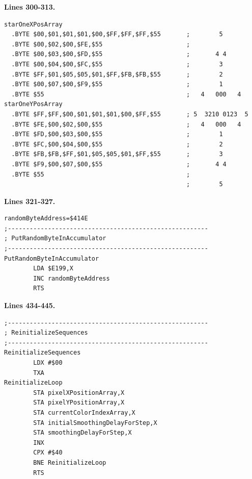 \clearpage
\textbf{Lines 300-313. }
\begin{lstlisting}[caption = Hopefully this looks familiar.]
starOneXPosArray
  .BYTE $00,$01,$01,$01,$00,$FF,$FF,$FF,$55       ;        5       
  .BYTE $00,$02,$00,$FE,$55                       ;                
  .BYTE $00,$03,$00,$FD,$55                       ;       4 4      
  .BYTE $00,$04,$00,$FC,$55                       ;        3       
  .BYTE $FF,$01,$05,$05,$01,$FF,$FB,$FB,$55       ;        2       
  .BYTE $00,$07,$00,$F9,$55                       ;        1       
  .BYTE $55                                       ;   4   000   4  
starOneYPosArray
  .BYTE $FF,$FF,$00,$01,$01,$01,$00,$FF,$55       ; 5  3210 0123  5
  .BYTE $FE,$00,$02,$00,$55                       ;   4   000   4  
  .BYTE $FD,$00,$03,$00,$55                       ;        1       
  .BYTE $FC,$00,$04,$00,$55                       ;        2       
  .BYTE $FB,$FB,$FF,$01,$05,$05,$01,$FF,$55       ;        3       
  .BYTE $F9,$00,$07,$00,$55                       ;       4 4      
  .BYTE $55                                       ;                
                                                  ;        5       
\end{lstlisting}

\textbf{Lines 321-327. }
\begin{lstlisting}[caption= Random\, unused\, feels like a metaphor.]
randomByteAddress=$414E
;-------------------------------------------------------
; PutRandomByteInAccumulator
;-------------------------------------------------------
PutRandomByteInAccumulator   
        LDA $E199,X
        INC randomByteAddress
        RTS 
\end{lstlisting}
\textbf{Lines 434-445. }
\begin{lstlisting}[caption = Fill our pixel arrays with zeros.]
;-------------------------------------------------------
; ReinitializeSequences
;-------------------------------------------------------
ReinitializeSequences   
        LDX #$00
        TXA 
ReinitializeLoop   
        STA pixelXPositionArray,X
        STA pixelYPositionArray,X
        STA currentColorIndexArray,X
        STA initialSmoothingDelayForStep,X
        STA smoothingDelayForStep,X
        INX 
        CPX #$40
        BNE ReinitializeLoop
        RTS 

\end{lstlisting}
\clearpage

